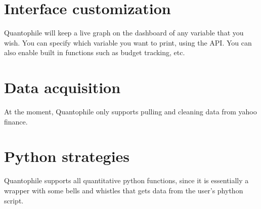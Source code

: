 \documentclass[a4paper]{article}
\begin{document}
\section{Interface customization}
    Quantophile will keep a live graph on the dashboard of any variable that you wish. You can specify which variable you want to print, using the API. You can also enable built in functions such as budget tracking, etc.

\section{Data acquisition}
    At the moment, Quantophile only supports pulling and cleaning data from yahoo finance. 

\section{Python strategies}
    Quantophile supports all quantitative python functions, since it is essentially a wrapper with some bells and whistles that gets data from the user's phython script.
           
\end{document}
